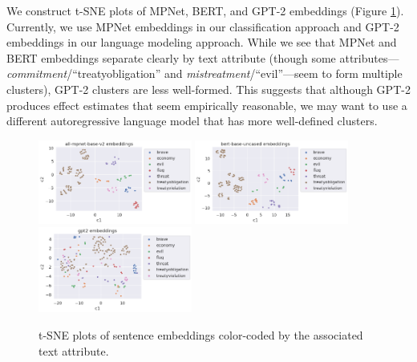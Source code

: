 \documentclass{article}
\begin{document}
We construct t-SNE plots of MPNet, BERT, and GPT-2 embeddings (Figure \ref{fig:alias_check}). Currently, we use MPNet embeddings in our classification approach and GPT-2 embeddings in our language modeling approach. While we see that MPNet and BERT embeddings separate clearly by text attribute (though some attributes--- \textit{commitment}/``treatyobligation'' and \textit{mistreatment}/``evil''---seem to form multiple clusters), GPT-2 clusters are less well-formed. This suggests that although GPT-2 produces effect estimates that seem empirically reasonable, we may want to use a different autoregressive language model that has more well-defined clusters.

\begin{figure}
    \centering
    \includegraphics[width=0.45\textwidth]{plots/sanity_check/all-mpnet-base-v2.png}
    \includegraphics[width=0.45\textwidth]{plots/sanity_check/bert-base-uncased.png}
    \includegraphics[width=0.45\textwidth]{plots/sanity_check/gpt2.png}
    \caption{t-SNE plots of sentence embeddings color-coded by the associated text attribute.}
    \label{fig:alias_check}
\end{figure}

\end{document}
